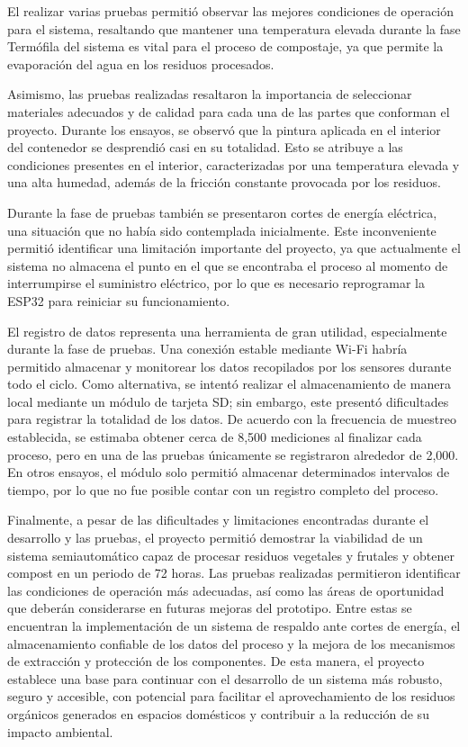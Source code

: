 El realizar varias pruebas permitió observar las mejores condiciones de operación para el sistema, resaltando que mantener una temperatura elevada durante la fase Termófila del sistema es vital para el proceso de compostaje, ya que permite la evaporación del agua en los residuos procesados.

Asimismo, las pruebas realizadas resaltaron la importancia de seleccionar materiales adecuados y de calidad para cada una de las partes que conforman el proyecto. Durante los ensayos, se observó que la pintura aplicada en el interior del contenedor se desprendió casi en su totalidad. Esto se atribuye a las condiciones presentes en el interior, caracterizadas por una temperatura elevada y una alta humedad, además de la fricción constante provocada por los residuos.

Durante la fase de pruebas también se presentaron cortes de energía eléctrica, una situación que no había sido contemplada inicialmente. Este inconveniente permitió identificar una limitación importante del proyecto, ya que actualmente el sistema no almacena el punto en el que se encontraba el proceso al momento de interrumpirse el suministro eléctrico, por lo que es necesario reprogramar la ESP32 para reiniciar su funcionamiento.

El registro de datos representa una herramienta de gran utilidad, especialmente durante la fase de pruebas. Una conexión estable mediante Wi-Fi habría permitido almacenar y monitorear los datos recopilados por los sensores durante todo el ciclo. Como alternativa, se intentó realizar el almacenamiento de manera local mediante un módulo de tarjeta SD; sin embargo, este presentó dificultades para registrar la totalidad de los datos. De acuerdo con la frecuencia de muestreo establecida, se estimaba obtener cerca de 8,500 mediciones al finalizar cada proceso, pero en una de las pruebas únicamente se registraron alrededor de 2,000. En otros ensayos, el módulo solo permitió almacenar determinados intervalos de tiempo, por lo que no fue posible contar con un registro completo del proceso.

Finalmente, a pesar de las dificultades y limitaciones encontradas durante el desarrollo y las pruebas, el proyecto permitió demostrar la viabilidad de un sistema semiautomático capaz de procesar residuos vegetales y frutales y obtener compost en un periodo de 72 horas. Las pruebas realizadas permitieron identificar las condiciones de operación más adecuadas, así como las áreas de oportunidad que deberán considerarse en futuras mejoras del prototipo. Entre estas se encuentran la implementación de un sistema de respaldo ante cortes de energía, el almacenamiento confiable de los datos del proceso y la mejora de los mecanismos de extracción y protección de los componentes. De esta manera, el proyecto establece una base para continuar con el desarrollo de un sistema más robusto, seguro y accesible, con potencial para facilitar el aprovechamiento de los residuos orgánicos generados en espacios domésticos y contribuir a la reducción de su impacto ambiental.


